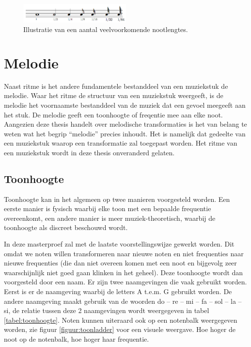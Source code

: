 \begin{figure}[!ht]
  \centering
  \includegraphics[width=0.5\textwidth]{1_Muzikale_Achtergrond/nootlengtes}
  \caption{Illustratie van een aantal veelvoorkomende nootlengtes.}
  \label{figuur:nootlengtes}
\end{figure}

\section{Melodie}
Naast ritme is het andere fundamentele bestanddeel van een muziekstuk de melodie. Waar het ritme de structuur van een muziekstuk weergeeft, is de melodie het voornaamste bestanddeel van de muziek dat een gevoel meegeeft aan het stuk. De melodie geeft een toonhoogte of freqentie mee aan elke noot. Aangezien deze thesis handelt over melodische transformaties is het van belang te weten wat het begrip ``melodie'' precies inhoudt. Het is namelijk dat gedeelte van een muziekstuk waarop een transformatie zal toegepast worden. Het ritme van een muziekstuk wordt in deze thesis onveranderd gelaten.

\subsection{Toonhoogte}
Toonhoogte kan in het algemeen op twee manieren voorgesteld worden. Een eerste manier is fysisch waarbij elke toon met een bepaalde frequentie overeenkomt, een andere manier is meer muziek-theoretisch, waarbij de toonhoogte als discreet beschouwd wordt. 

In deze masterproef zal met de laatste voorstellingswijze gewerkt worden. Dit omdat we noten willen transformeren naar nieuwe noten en niet frequenties naar nieuwe frequenties (die dan niet overeen komen met een noot en bijgevolg zeer waarschijnlijk niet goed gaan klinken in het geheel). Deze toonhoogte wordt dan voorgesteld door een naam. Er zijn twee naamgevingen die vaak gebruikt worden. Eerst is er de naamgeving waarbij de letters A t.e.m. G gebruikt worden. De andere naamgeving maakt gebruik van de woorden do -- re -- mi -- fa -- sol -- la -- si, de relatie tussen deze 2 naamgevingen wordt weergegeven in tabel \ref{tabel:toonhoogte}. Noten kunnen uiteraard ook op een notenbalk weergegeven worden, zie figuur \ref{figuur:toonladder} voor een visuele weergave. Hoe hoger de noot op de notenbalk, hoe hoger haar frequentie.

